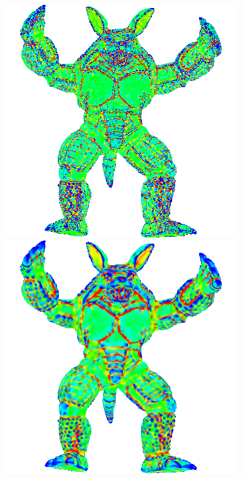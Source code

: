 \begin{figure}[!h]
    \endminipage\hfill
    \centering
    \centering
    \includegraphics[scale=0.7]{images/armadillo-mce.png}
    \endminipage\hfill
    \centering
    \centering
    \includegraphics[scale=0.7]{images/armadillo-mcv.png}
    \endminipage\hfill
    \centering

\end{figure}
